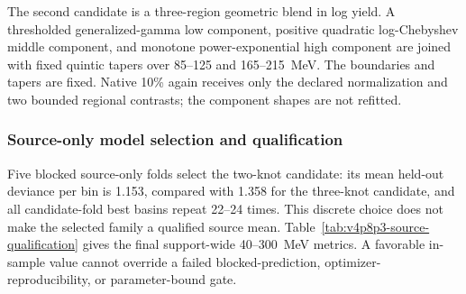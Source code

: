 The second candidate is a three-region geometric blend in log yield.  A
thresholded generalized-gamma low component, positive quadratic
log-Chebyshev middle component, and monotone power-exponential high component
are joined with fixed quintic tapers over 85--125 and 165--215~MeV.  The
boundaries and tapers are fixed.  Native 10\% again receives only the declared
normalization and two bounded regional contrasts; the component shapes are not
refitted.

\subsubsection{Source-only model selection and qualification}

Five blocked source-only folds select the two-knot candidate: its mean
held-out deviance per bin is 1.153, compared with 1.358 for the three-knot
candidate, and all candidate-fold best basins repeat 22--24 times.  This
discrete choice does not make the selected family a qualified source mean.
Table~\ref{tab:v4p8p3-source-qualification} gives the final support-wide
40--300~MeV metrics.  A favorable in-sample value cannot override a failed
blocked-prediction, optimizer-reproducibility, or parameter-bound gate.

\begin{table}[htbp]
\centering
\caption{Source-only qualification of the two frozen residual-structured
means over the complete 40--300~MeV support.  P/D denotes the
Pearson/deviance pair.  The normalized bound margin is the minimum distance to
a fitted-parameter bound; zero denotes contact.}
\label{tab:v4p8p3-source-qualification}
\end{table}

